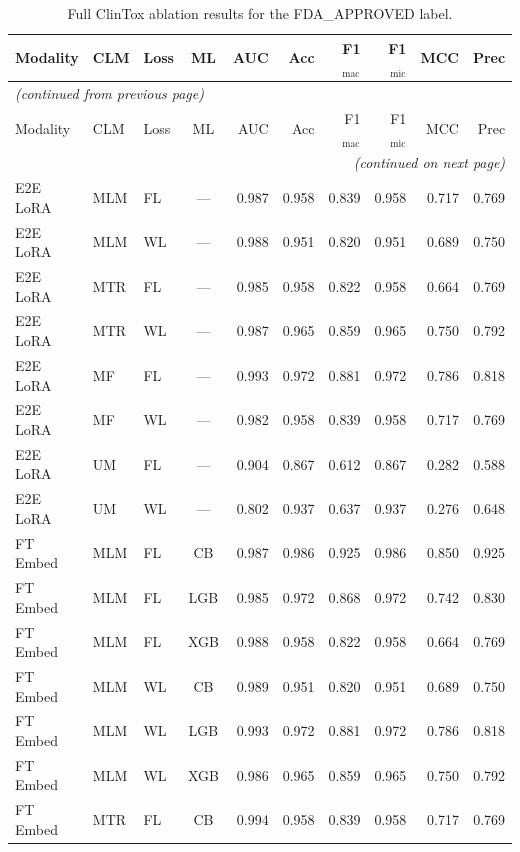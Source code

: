 \documentclass[9pt,a4paper]{article}
\begin{document}
\begin{scriptsize}
\begin{longtable}{lllcrrrrrr}
\caption{Full ClinTox ablation results for the FDA\_APPROVED label.}
\label{tab:s4_clintox} \\
\toprule
Modality & CLM & Loss & ML & AUC & Acc & F1$_\text{mac}$ & F1$_\text{mic}$ & MCC & Prec \\
\midrule
\endfirsthead
\multicolumn{10}{l}{\footnotesize\textit{(continued from previous page)}} \\
\toprule
Modality & CLM & Loss & ML & AUC & Acc & F1$_\text{mac}$ & F1$_\text{mic}$ & MCC & Prec \\
\midrule
\endhead
\midrule
\multicolumn{10}{r}{\footnotesize\textit{(continued on next page)}} \\
\endfoot
\bottomrule
\endlastfoot
E2E LoRA & MLM & FL & --- & 0.987 & 0.958 & 0.839 & 0.958 & 0.717 & 0.769 \\
E2E LoRA & MLM & WL & --- & 0.988 & 0.951 & 0.820 & 0.951 & 0.689 & 0.750 \\
E2E LoRA & MTR & FL & --- & 0.985 & 0.958 & 0.822 & 0.958 & 0.664 & 0.769 \\
E2E LoRA & MTR & WL & --- & 0.987 & 0.965 & 0.859 & 0.965 & 0.750 & 0.792 \\
E2E LoRA & MF  & FL & --- & 0.993 & 0.972 & 0.881 & 0.972 & 0.786 & 0.818 \\
E2E LoRA & MF  & WL & --- & 0.982 & 0.958 & 0.839 & 0.958 & 0.717 & 0.769 \\
E2E LoRA & UM  & FL & --- & 0.904 & 0.867 & 0.612 & 0.867 & 0.282 & 0.588 \\
E2E LoRA & UM  & WL & --- & 0.802 & 0.937 & 0.637 & 0.937 & 0.276 & 0.648 \\
\midrule
FT Embed & MLM & FL & CB  & 0.987 & 0.986 & 0.925 & 0.986 & 0.850 & 0.925 \\
FT Embed & MLM & FL & LGB & 0.985 & 0.972 & 0.868 & 0.972 & 0.742 & 0.830 \\
FT Embed & MLM & FL & XGB & 0.988 & 0.958 & 0.822 & 0.958 & 0.664 & 0.769 \\
FT Embed & MLM & WL & CB  & 0.989 & 0.951 & 0.820 & 0.951 & 0.689 & 0.750 \\
FT Embed & MLM & WL & LGB & 0.993 & 0.972 & 0.881 & 0.972 & 0.786 & 0.818 \\
FT Embed & MLM & WL & XGB & 0.986 & 0.965 & 0.859 & 0.965 & 0.750 & 0.792 \\
FT Embed & MTR & FL & CB  & 0.994 & 0.958 & 0.839 & 0.958 & 0.717 & 0.769 \\

\end{longtable}
\end{scriptsize}
\end{document}

